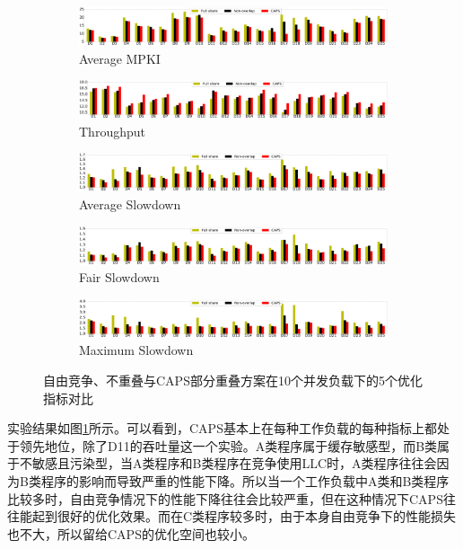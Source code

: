 \begin{figure}[htbp] 
    \centering
    \begin{subfigure}[b]{1\linewidth}
        \centering\includegraphics[width=0.95\linewidth]{figures/d20_miss.pdf}
        \caption{Average MPKI}
    \end{subfigure}
    \begin{subfigure}[b]{1\linewidth}
        \centering\includegraphics[width=0.95\linewidth]{figures/d20_ipc.pdf}
        \caption{Throughput}
    \end{subfigure}
    \begin{subfigure}[b]{1\linewidth}
        \centering\includegraphics[width=0.95\linewidth]{figures/d20_ws.pdf}
        \caption{Average Slowdown}
    \end{subfigure}
    \begin{subfigure}[b]{1\linewidth}
        \centering\includegraphics[width=0.95\linewidth]{figures/d20_fs.pdf}
        \caption{Fair Slowdown}
    \end{subfigure}
    \begin{subfigure}[b]{1\linewidth}
        \centering\includegraphics[width=0.95\linewidth]{figures/d20_ms.pdf}
        \caption{Maximum Slowdown}
    \end{subfigure}
    \caption{自由竞争、不重叠与CAPS部分重叠方案在10个并发负载下的5个优化指标对比}
    \label{fig:10w}
\end{figure}

实验结果如图\ref{fig:10w}所示。可以看到，CAPS基本上在每种工作负载的每种指标上都处于领先地位，除了D11的吞吐量这一个实验。A类程序属于缓存敏感型，而B类属于不敏感且污染型，当A类程序和B类程序在竞争使用LLC时，A类程序往往会因为B类程序的影响而导致严重的性能下降。所以当一个工作负载中A类和B类程序比较多时，自由竞争情况下的性能下降往往会比较严重，但在这种情况下CAPS往往能起到很好的优化效果。而在C类程序较多时，由于本身自由竞争下的性能损失也不大，所以留给CAPS的优化空间也较小。

